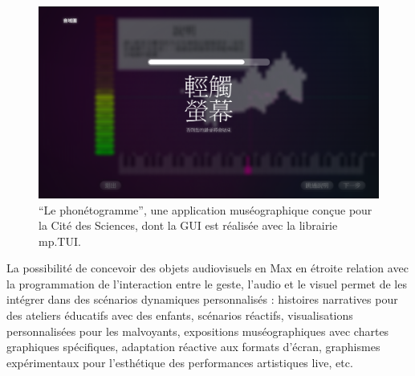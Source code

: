 \begin{figure}[!htbp]
	\captionsetup{format=plain}%
	\includegraphics[width=\textwidth]{gfx/06_visual_representation/Phonetogramme.png}
	\caption[``Le phonétogramme'', une application réalisée à l'aide de la librairie mp.TUI]{``Le phonétogramme'', une application muséographique conçue pour la Cité des Sciences, dont la GUI est réalisée avec la librairie mp.TUI.}
	\label{fig:visual_representation:phonetogramme}
\end{figure}

\noindent La possibilité de concevoir des objets audiovisuels en Max en étroite relation avec la programmation de l'interaction entre le geste, l'audio et le visuel permet de les intégrer dans des scénarios dynamiques personnalisés : histoires narratives pour des ateliers éducatifs avec des enfants, scénarios réactifs, visualisations personnalisées pour les malvoyants, expositions muséographiques avec chartes graphiques spécifiques, adaptation réactive aux formats d'écran, graphismes expérimentaux pour l'esthétique des performances artistiques live, etc.


